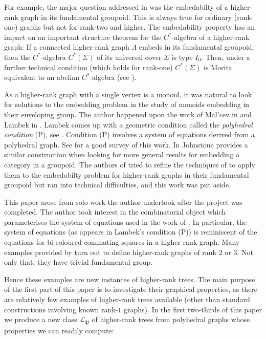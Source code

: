\documentclass[12pt]{amsart}
\theoremstyle{definition}
\theoremstyle{remark}
\numberwithin{equation}{section}
\begin{document}
For example, the major question addressed in \cite{bkps} was the embedabilty of a higher-rank graph in its fundamental groupoid. This is always true for ordinary (rank-one) graphs but not for rank-two and higher. The embedability property has an impact on an important structure theorem for the $C^*$-algebra of a higher-rank graph: If a connected higher-rank graph $\Lambda$ embeds in its fundamental groupoid, then the $C^*$-algebra $C^* ( \Sigma )$ of its universal cover $\Sigma$ is type $I_0$. Then, under a further technical condition (which holds for rank-one)  $C^* ( \Sigma)$ is Morita equivalent to an abelian $C^*$-algebra (see \cite[Theorem 4.1]{bkps}).

As a higher-rank graph with a single vertex is a monoid, it was natural to look for solutions to the embedding problem in the study of monoids embedding in their enveloping group. The author happened upon the work of Ma{l}'cev in \cite{Malcev} and Lambek in \cite{Lambek}. Lambek comes up with a geometric condition called the \emph{polyhedral condition} (P), see \cite[p.\ 35]{Lambek}. Condition (P)  involves a system of equations derived from a polyhedral graph.
See \cite{Holl} for a good survey of this work. In \cite{Johnstone} Johnstone provides a similar construction when looking for  more general results for embedding a category in a groupoid. 
The authors of \cite{bkps} tried to refine the techniques of \cite{Lambek,Johnstone} to apply them to the embedabilty problem for higher-rank graphs in their fundamental groupoid but ran into technical difficulties, and this work was put aside.

This paper arose from solo work the author undertook after the project  \cite{bkps} was completed. The author took interest in the combinatorial object which parameterises the system of equations used in the work of \cite{Lambek,Johnstone}. In particular, the system of equations (as appears in Lambek's condition (P)) is reminiscent of the equations for bi-coloured commuting squares in a higher-rank graph. Many examples provided by \cite{Lambek, B} turn out to define higher-rank graphs of rank $2$ or $3$. Not only that, they have trivial fundamental group. 

Hence these examples are new instances of higher-rank trees.  The main purpose of the first part of this paper is to investigate their graphical properties, as there are relatively few examples of higher-rank trees available (other than standard constructions involving known rank-$1$ graphs). In the first two-thirds of this paper we produce a new class $\mathcal{L}_{\mathfrak{P}}$ of higher-rank trees from polyhedral graphs whose properties we can readily compute:
\end{document}
